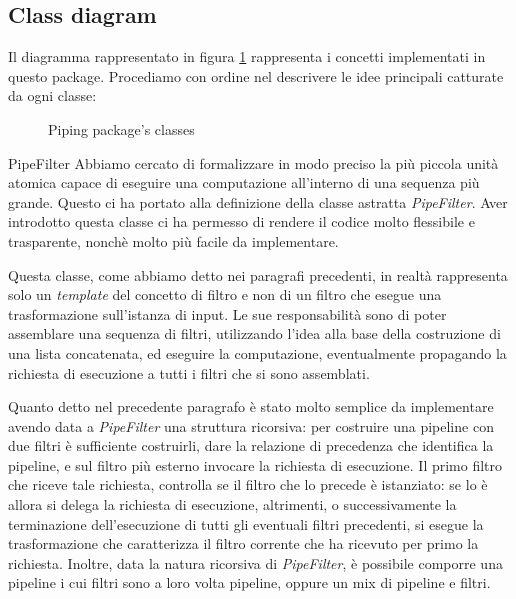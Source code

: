 \subsection{Class diagram}
Il diagramma rappresentato in figura \ref{fig:piping-package-classes}
rappresenta i concetti implementati in questo package. Procediamo con
ordine nel descrivere le idee principali catturate da ogni classe:

\begin{figure}
  \centering
  \caption{Piping package's classes}
  \label{fig:piping-package-classes}
\end{figure}

\begin{paragraph}{PipeFilter}
  Abbiamo cercato di formalizzare in modo preciso la pi\`u piccola
  unit\`a atomica capace di eseguire una computazione all'interno di
  una sequenza pi\`u grande. Questo ci ha portato alla definizione
  della classe astratta \emph{PipeFilter}. Aver introdotto questa
  classe ci ha permesso di rendere il codice molto flessibile e
  trasparente, nonch\`e molto pi\`u facile da implementare.

  Questa classe, come abbiamo detto nei paragrafi precedenti, in
  realt\`a rappresenta solo un \emph{template} del concetto di filtro
  e non di un filtro che esegue una trasformazione sull'istanza di
  input. Le sue responsabilit\`a sono di poter assemblare una sequenza
  di filtri, utilizzando l'idea alla base della costruzione di una
  lista concatenata, ed eseguire la computazione, eventualmente
  propagando la richiesta di esecuzione a tutti i filtri che si sono
  assemblati.

  Quanto detto nel precedente paragrafo \`e stato molto semplice da
  implementare avendo data a \emph{PipeFilter} una struttura
  ricorsiva: per costruire una pipeline con due filtri \`e sufficiente
  costruirli, dare la relazione di precedenza che identifica la
  pipeline, e sul filtro pi\`u esterno invocare la richiesta di
  esecuzione. Il primo filtro che riceve tale richiesta, controlla se
  il filtro che lo precede \`e istanziato: se lo \`e allora si delega
  la richiesta di esecuzione, altrimenti, o successivamente la
  terminazione dell'esecuzione di tutti gli eventuali filtri
  precedenti, si esegue la trasformazione che caratterizza il filtro
  corrente che ha ricevuto per primo la richiesta. Inoltre, data la
  natura ricorsiva di \emph{PipeFilter}, \`e possibile comporre una
  pipeline i cui filtri sono a loro volta pipeline, oppure un mix di
  pipeline e filtri.


\end{paragraph}
